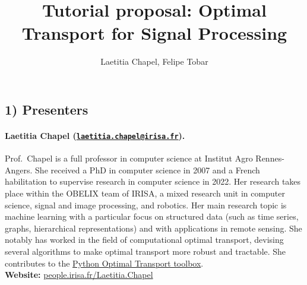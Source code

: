 \documentclass{article}
\title{\vspace{-1.5cm}Tutorial proposal:
Optimal Transport for Signal Processing
\vspace{-.2cm}}
\author{Laetitia Chapel, Felipe Tobar}
\date{}
\begin{document}
\maketitle\vspace{-1cm}



\subsection*{1) Presenters}

\paragraph{Laetitia Chapel (\href{mailto:laetitia.chapel@irisa.fr}{\texttt{laetitia.chapel@irisa.fr}}).} Prof.~Chapel is a full professor in computer science at Institut Agro Rennes-Angers. She received a PhD in computer science in 2007 and a French habilitation to supervise research in computer science in 2022. Her research takes place within the OBELIX team of IRISA, a mixed research unit in computer science, signal and image processing, and robotics. Her main research topic is machine learning with a particular focus on structured data (such as time series, graphs, hierarchical representations) and with applications in remote sensing. She notably has worked in the field of computational optimal transport, devising several algorithms to make optimal transport more robust and tractable. She contributes to the \href{https://pythonot.github.io/}{Python Optimal Transport toolbox}. \\
\textbf{Website:} \href{https://people.irisa.fr/Laetitia.Chapel/}{people.irisa.fr/Laetitia.Chapel}
\end{document}
